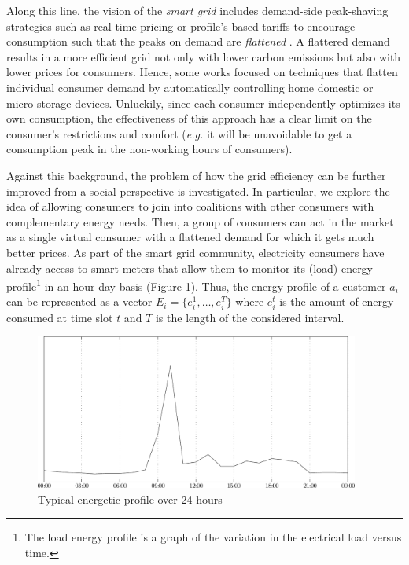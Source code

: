 \documentclass[11pt, twoside, titlepage, a4paper, openright]{report}
\begin{document}
Along this line, the vision of the \textit{smart grid} includes demand-side peak-shaving
strategies such as real-time pricing or profile's based tariffs to encourage
consumption such that the peaks on demand are \emph{flattened}
\cite{GridVision}. A flattered demand results in a more efficient grid not only
with lower carbon emissions but also with lower prices for
consumers. Hence, some works \cite{DBLP:conf/atal/RamchurnVRJ11,
DBLP:journals/network/TomprosMDFH09} focused on techniques that flatten
individual consumer demand by automatically controlling home domestic or micro-storage devices. Unluckily,
since each consumer independently optimizes its own consumption,
the effectiveness of this approach has a clear limit on the consumer's restrictions
and comfort (\textit{e.g.} it will be unavoidable to get a consumption peak in the
non-working hours of consumers).

Against this background, the problem of how the grid efficiency can be
further improved from a social perspective is investigated. In particular, we explore the
idea of allowing consumers to join into coalitions with other consumers with
complementary energy needs. Then, a group of consumers can act in the market
as a single virtual consumer with a flattened demand for which it gets much better
prices. As part of the smart grid community, electricity consumers have already
access to smart meters that allow them to monitor its (load) energy profile\footnote{
The load energy profile is a graph of the variation in the electrical load versus
time.} in an hour-day basis (Figure \ref{fig:energyprofile}). Thus, the energy profile of a customer $a_i$ can be represented as a vector $E_i=\{e^1_i,\ldots,e^T_i\}$ where $e^t_i$ is the amount of energy consumed at time slot $t$ and $T$ is the length of the considered interval.

\begin{figure}[!h]
	\centering
	\includegraphics[width=0.95\textwidth]{img/energy_profile.pdf}
	\caption{\label{fig:energyprofile}Typical energetic profile over 24 hours}
\end{figure}
\end{document}
